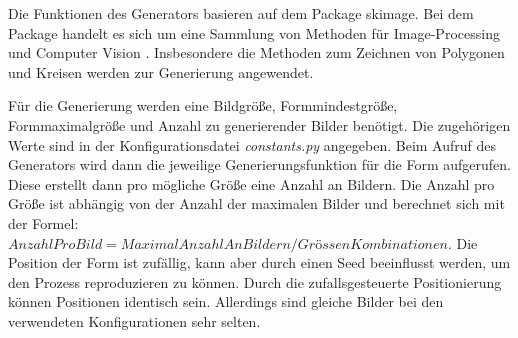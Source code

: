 Die Funktionen des Generators basieren auf dem Package skimage.
Bei dem Package handelt es sich um eine Sammlung von Methoden für Image-Processing und Computer Vision .
Insbesondere die Methoden zum Zeichnen von Polygonen und Kreisen werden zur Generierung angewendet.
\newline

Für die Generierung werden eine Bildgröße, Formmindestgröße, Formmaximalgröße und Anzahl zu generierender Bilder benötigt.
Die zugehörigen Werte sind in der Konfigurationsdatei \textit{constants.py} angegeben.
Beim Aufruf des Generators wird dann die jeweilige Generierungsfunktion für die Form aufgerufen.
Diese erstellt dann pro mögliche Größe eine Anzahl an Bildern.
Die Anzahl pro Größe ist abhängig von der Anzahl der maximalen Bilder und berechnet sich mit der Formel: $AnzahlProBild = MaximalAnzahlAnBildern / GrössenKombinationen$.
Die Position der Form ist zufällig, kann aber durch einen Seed beeinflusst werden, um den Prozess reproduzieren zu können.
Durch die zufallsgesteuerte Positionierung können Positionen identisch sein.
Allerdings sind gleiche Bilder bei den verwendeten Konfigurationen sehr selten. 

